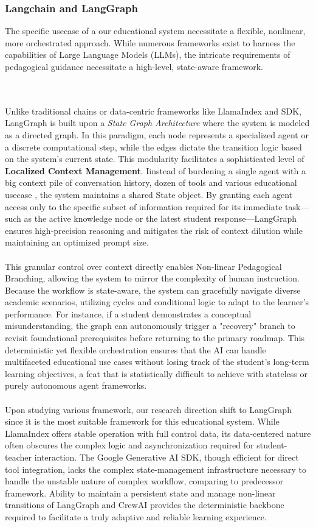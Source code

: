 \subsubsection{Langchain and LangGraph}
The specific usecase of a our educational system necessitate a flexible, nonlinear, more orchestrated approach. While numerous frameworks exist to harness the capabilities of Large Language Models (LLMs), the intricate requirements of pedagogical guidance necessitate a high-level, state-aware framework.

\\\\
Unlike traditional chains or data-centric frameworks like LlamaIndex and SDK, LangGraph is built upon a \textit{State Graph Architecture} where the system is modeled as a directed graph. In this paradigm, each node represents a specialized agent or a discrete computational step, while the edges dictate the transition logic based on the system’s current state. This modularity facilitates a sophisticated level of \textbf{Localized Context Management}. Iinstead of burdening a single agent with a big context pile of conversation history, dozen of tools and various educational usecase , the system maintains a shared State object. By granting each agent access only to the specific subset of information required for its immediate task—such as the active knowledge node or the latest student response—LangGraph ensures high-precision reasoning and mitigates the risk of context dilution while maintaining an optimized prompt size.
\\\\
This granular control over context directly enables {Non-linear Pedagogical Branching}, allowing the system to mirror the complexity of human instruction. Because the workflow is state-aware, the system can gracefully navigate diverse academic scenarios, utilizing cycles and conditional logic to adapt to the learner's performance. For instance, if a student demonstrates a conceptual misunderstanding, the graph can autonomously trigger a "recovery" branch to revisit foundational prerequisites before returning to the primary roadmap. This deterministic yet flexible orchestration ensures that the AI can handle multifaceted educational use cases without losing track of the student's long-term learning objectives, a feat that is statistically difficult to achieve with stateless or purely autonomous agent frameworks.
\\\\
Upon studying various framework, our research direction shift to LangGraph since it is the most suitable framework for this educational system. While LlamaIndex offers stable operation with full control data, its data-centered nature often obscures the complex logic and asynchronization required for student-teacher interaction. The Google Generative AI SDK, though efficient for direct tool integration, lacks the complex state-management infrastructure necessary to handle the unstable nature of complex workflow, comparing to predecessor framework. Ability to maintain a persistent state and manage non-linear transitions of LangGraph and CrewAI provides the deterministic backbone required to facilitate a truly adaptive and reliable learning experience.

